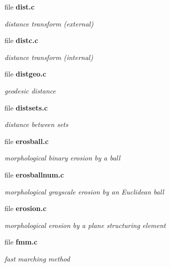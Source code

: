 \begin{CompactItemize}
\item 
file {\bf dist.c}
\begin{CompactList}\small\item\em distance transform (external) \item\end{CompactList}

\item 
file {\bf distc.c}
\begin{CompactList}\small\item\em distance transform (internal) \item\end{CompactList}

\item 
file {\bf distgeo.c}
\begin{CompactList}\small\item\em geodesic distance \item\end{CompactList}

\item 
file {\bf distsets.c}
\begin{CompactList}\small\item\em distance between sets \item\end{CompactList}

\item 
file {\bf erosball.c}
\begin{CompactList}\small\item\em morphological binary erosion by a ball \item\end{CompactList}

\item 
file {\bf erosballnum.c}
\begin{CompactList}\small\item\em morphological grayscale erosion by an Euclidean ball \item\end{CompactList}

\item 
file {\bf erosion.c}
\begin{CompactList}\small\item\em morphological erosion by a plane structuring element \item\end{CompactList}

\item 
file {\bf fmm.c}
\begin{CompactList}\small\item\em fast marching method \item\end{CompactList}


\end{CompactItemize}
